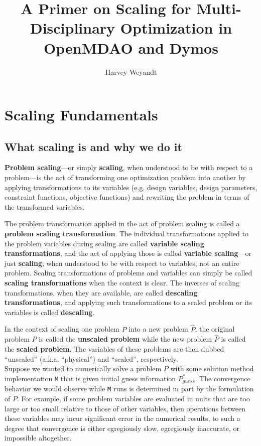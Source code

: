 \documentclass{article}
\title{A Primer on Scaling for Multi-Disciplinary Optimization in OpenMDAO and Dymos}
\author{Harvey Weyandt}
\date{}
\begin{document}
\maketitle

\tableofcontents

\newpage
\section{Scaling Fundamentals}

\subsection*{What scaling is and why we do it}

\textbf{Problem scaling}---or simply \textbf{scaling}, when understood to be with respect to a problem---is the act of transforming one optimization problem into another by applying transformations to its variables (e.g. design variables, design parameters, constraint functions, objective functions) and rewriting the problem in terms of the transformed variables. 

The problem transformation applied in the act of problem scaling is called a \textbf{problem scaling transformation}. The individual transformations applied to the problem variables during scaling are called \textbf{variable scaling transformations}, and the act of applying those is called \textbf{variable scaling}---or just \textbf{scaling}, when understood to be with respect to variables, not an entire problem. Scaling transformations of problems and variables can simply be called \textbf{scaling transformations} when the context is clear. The inverses of scaling transformations, when they are available, are called \textbf{descaling transformations}, and applying such transformations to a scaled problem or its variables is called \textbf{descaling}.

In the context of scaling one problem $P$ into a new problem $\hat{P}$, the original problem $P$ is called the \textbf{unscaled problem} while the new problem $\hat{P}$ is called the \textbf{scaled problem}. The variables of these problems are then dubbed ``unscaled'' (a.k.a. ``physical'') and ``scaled'', respectively.
\\

\noindent
Suppose we wanted to numerically solve a problem $P$ with some solution method implementation \texttt{M} that is given initial guess information $P_{guess}^*$. The convergence behavior we would observe while \texttt{M} runs is determined in part by the formulation of $P$. For example, if some problem variables are evaluated in units that are too large or too small relative to those of other variables, then operations between these variables may incur significant error in the numerical results, to such a degree that convergence is either egregiously slow, egregiously inaccurate, or impossible altogether. 
\end{document}
